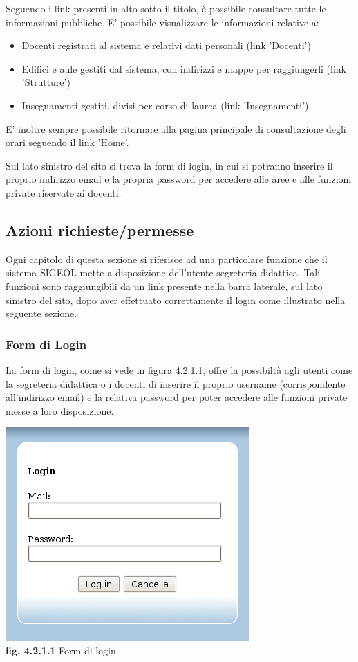 \documentclass[11pt,a4paper]{article}
\begin{document}
Seguendo i link presenti in alto sotto il titolo, è possibile consultare tutte le informazioni pubbliche. E' possibile visualizzare le informazioni relative a:
\begin{itemize}
 \item Docenti registrati al sistema e relativi dati personali (link 'Docenti')
 \item Edifici e aule gestiti dal sistema, con indirizzi e mappe per raggiungerli (link 'Strutture')
 \item Insegnamenti gestiti, divisi per corso di laurea (link 'Insegnamenti')
\end{itemize}

E' inoltre sempre possibile ritornare alla pagina principale di consultazione degli orari seguendo il link 'Home'.

Sul lato sinistro del sito si trova la form di login, in cui si potranno inserire il proprio indirizzo email e la propria password per accedere alle aree e alle funzioni private riservate ai docenti.
\subsection{Azioni richieste/permesse}
Ogni capitolo di questa sezione si riferisce ad una particolare funzione che il sistema SIGEOL mette a disposizione dell'utente segreteria didattica. Tali funzioni sono raggiungibili da un link presente nella barra laterale, sul lato sinistro del sito, dopo aver effettuato correttamente il login come illustrato nella seguente sezione.
\subsubsection{Form di Login}
La form di login, come si vede in figura 4.2.1.1, offre la possibiltà agli utenti come la segreteria didattica o i docenti di inserire il proprio username (corrispondente all'indirizzo email) e la relativa password per poter accedere alle funzioni private messe a loro disposizione.

\bigskip
\begin{center}
	\includegraphics[scale=0.5]{images/login.jpg}\\
	\textbf{fig. 4.2.1.1} Form di login\\
\end{center}
\bigskip
\end{document}

